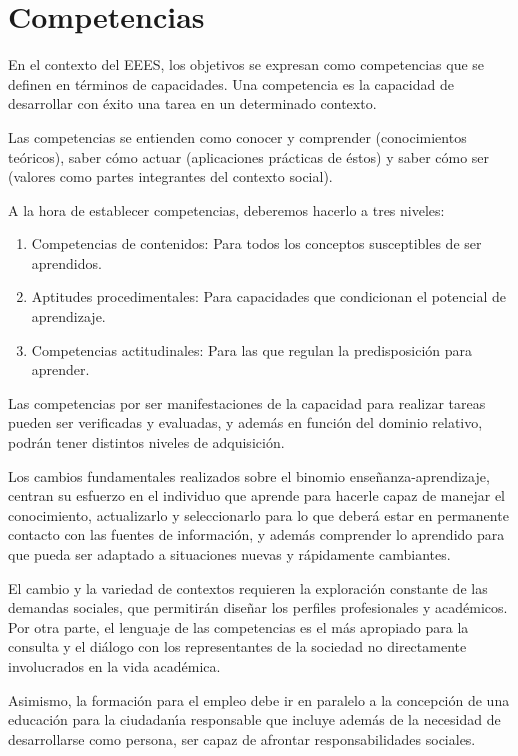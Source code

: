 \newpage
\section{Competencias}\label{compet}
En el  contexto del EEES, los  objetivos se expresan como 
{ competencias} que se definen en t\'{e}rminos de {  capacidades}.
Una  competencia es la capacidad de desarrollar con \'{e}xito una tarea
en un determinado contexto. 


Las competencias se entienden como {  conocer} y {  comprender} 
(conocimientos te\'{o}ricos), saber c\'{o}mo {  actuar} (aplicaciones
pr\'{a}cticas de \'{e}stos) y saber c\'{o}mo { ser } (valores como
partes integrantes del contexto social).

A  la hora de establecer competencias, deberemos
hacerlo a tres niveles:
\begin{enumerate}
\item Competencias de contenidos: Para todos los conceptos susceptibles de ser aprendidos.
\item Aptitudes procedimentales: Para capacidades que condicionan el
potencial de aprendizaje.
\item Competencias actitudinales:  Para las que regulan la predisposici\'{o}n
para aprender.
\end{enumerate}


Las competencias por ser manifestaciones de la capacidad para realizar
tareas pueden ser {  verificadas} y {  evaluadas}, y adem\'{a}s
en funci\'{o}n del dominio relativo, podr\'{a}n tener distintos
{  niveles} de adquisici\'{o}n.

Los cambios fundamentales realizados sobre el binomio 
ense\~{n}anza-aprendizaje, centran su esfuerzo en el 
{  individuo que aprende} para hacerle capaz de {  manejar
el conocimiento}, actualizarlo y seleccionarlo para lo que deber\'{a} estar
en permanente contacto con las fuentes de informaci\'{o}n, y 
adem\'{a}s comprender lo aprendido para que pueda ser
adaptado a situaciones nuevas y r\'{a}pidamente cambiantes.

El cambio y la variedad de contextos requieren {  la exploraci\'{o}n 
constante de las demandas sociales},  que permitir\'{a}n dise\~{n}ar
los perfiles profesionales y acad\'{e}micos. Por otra parte, el 
lenguaje de las competencias es el m\'{a}s apropiado para la 
{  consulta y el di\'{a}logo} con los representantes de la sociedad
no directamente involucrados en la vida acad\'{e}mica.

Asimismo, la formaci\'{o}n para el empleo debe ir en paralelo a la 
concepci\'{o}n de una {  educaci\'{o}n  para la ciudadan\'{\i}a responsable}
que incluye adem\'{a}s de la necesidad de desarrollarse como persona,
ser capaz de afrontar responsabilidades sociales.


